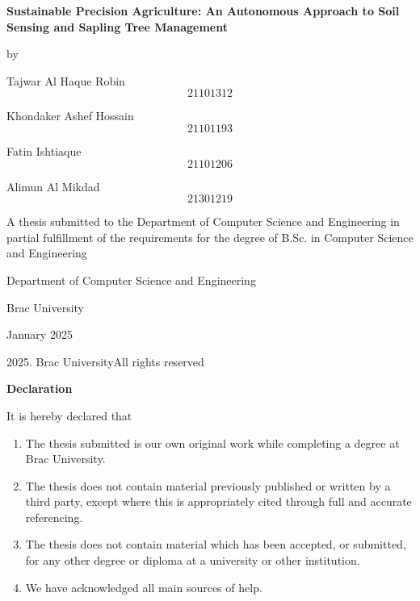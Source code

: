 \documentclass{book} %
\begin{document}


\noindent \textbf{Sustainable Precision Agriculture: An Autonomous Approach to Soil Sensing and Sapling Tree Management}

\noindent \textbf{}

\noindent by 

\noindent 

\noindent 

\noindent Tajwar Al Haque Robin
\[21101312\] 


\noindent Khondaker Ashef Hossain
\[21101193\] 


\noindent Fatin Ishtiaque
\[21101206\] 


\noindent  Alimun Al Mikdad
\[21301219\] 
\textbf{ }

\noindent A thesis submitted to the Department of Computer Science and Engineering in partial fulfillment of the requirements for the degree of B.Sc. in Computer Science and Engineering

\noindent 

\noindent Department of Computer Science and Engineering 

\noindent Brac University

\noindent January 2025

\noindent 

\noindent 

\noindent {\copyright} 2025. Brac UniversityAll rights reserved

\noindent \eject \textbf{}

\noindent \textbf{Declaration}

\noindent It is hereby declared that

\noindent 

\begin{enumerate}
\item  The thesis submitted is our own original work while completing a degree at Brac University.

\item  The thesis does not contain material previously published or written by a third party, except where this is appropriately cited through full and accurate referencing.

\item  The thesis does not contain material which has been accepted, or submitted, for any other degree or diploma at a university or other institution.

\item  We have acknowledged all main sources of help.
\end{enumerate}
\end{document}
